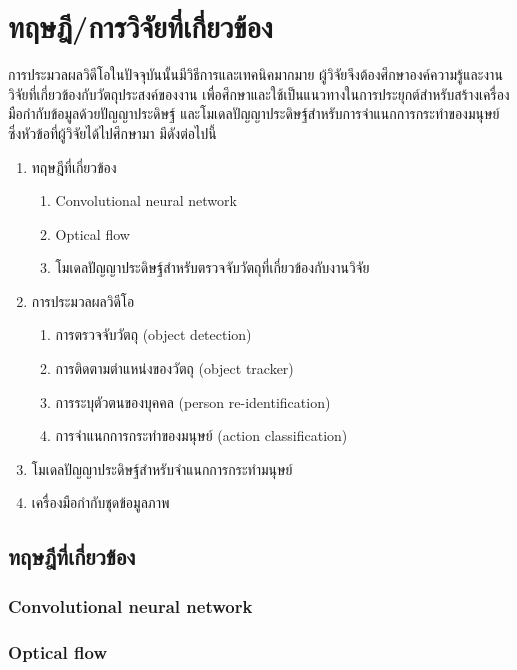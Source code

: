 \clearpage
\chapter{ทฤษฎี/การวิจัยที่เกี่ยวข้อง}
การประมวลผลวิดีโอในปัจจุบันนั้นมีวิธีการและเทคนิคมากมาย ผู้วิจัยจึงต้องศึกษาองค์ความรู้และงานวิจัยที่เกี่ยวข้องกับวัตถุประสงค์ของงาน 
เพื่อศึกษาและใช้เป็นแนวทางในการประยุกต์สำหรับสร้างเครื่องมือกำกับข้อมูลด้วยปัญญาประดิษฐ์ และโมเดลปัญญาประดิษฐ์สำหรับการจำแนกการกระทำของมนุษย์ 
ซึ่งหัวข้อที่ผู้วิจัยได้ไปศึกษามา มีดังต่อไปนี้
\begin{enumerate}
	\setlength\itemsep{-0.25em}
	\item ทฤษฎีที่เกี่ยวข้อง
	\begin{enumerate}
		\item Convolutional neural network
		\item Optical flow
		\item โมเดลปัญญาประดิษฐ์สำหรับตรวจจับวัตถุที่เกี่ยวข้องกับงานวิจัย
	\end{enumerate}
	\item การประมวลผลวิดีโอ
	\begin{enumerate}	
		\item การตรวจจับวัตถุ (object detection)
		\item การติดตามตำแหน่งของวัตถุ (object tracker)
		\item การระบุตัวตนของบุคคล (person re-identification)
		\item การจำแนกการกระทำของมนุษย์ (action classification)
	\end{enumerate}
	\item โมเดลปัญญาประดิษฐ์สำหรับจำแนกการกระทำมนุษย์
	\item เครื่องมือกำกับชุดข้อมูลภาพ
\end{enumerate}
\clearpage

\section{ทฤษฎีที่เกี่ยวข้อง}
\subsection{Convolutional neural network}

\clearpage

\subsection{Optical flow}

\clearpage

